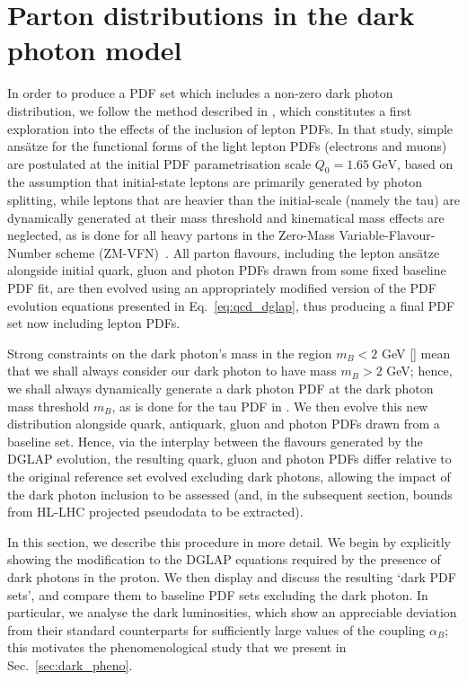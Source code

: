 \documentclass[withindex,glossary]{cam-thesis}
\begin{document}
\section{Parton distributions in the dark photon model}
\label{sec:dark_pdfs}
In order to produce a PDF set which includes a non-zero dark photon distribution,
we follow the method described in \cite{Bertone:2015lqa},
which constitutes a first exploration into the effects of the inclusion of lepton PDFs.
In that study, 
simple ans\"{a}tze for the functional forms of the light lepton PDFs (electrons and muons)
are postulated at the initial PDF parametrisation scale $Q_0 = 1.65\ \text{GeV}$, based on the assumption that
initial-state leptons are primarily generated by photon splitting, 
while leptons that are heavier than the initial-scale (namely the
tau) are dynamically generated at their mass threshold and
kinematical mass effects are neglected, as is done for all heavy
partons in the Zero-Mass Variable-Flavour-Number scheme (ZM-VFN)~\cite{Maltoni:2012pa,Bertone:2017djs}.  
%
All parton flavours, including the lepton ans\"{a}tze alongside initial quark,
gluon and photon PDFs drawn from some fixed baseline PDF fit, are then
evolved using an appropriately modified version of the PDF evolution equations presented
in Eq.~\eqref{eq:qcd_dglap}, thus producing
a final PDF set now including lepton PDFs. 

Strong constraints on the dark photon's mass in the region $m_B < 2$ GeV [] mean
that we shall always consider our dark photon to have mass $m_B > 2$ GeV; hence,
we shall always dynamically generate a dark photon PDF at the dark photon mass threshold $m_B$,
as is done for the tau PDF in \cite{Bertone:2015lqa}.
We then evolve this new distribution alongside quark, antiquark,
gluon and photon PDFs drawn from a baseline set.
Hence, via the interplay between the flavours generated by
the DGLAP evolution, the resulting quark, gluon and photon PDFs differ relative
to the original reference set evolved excluding dark photons, allowing the impact
of the dark photon inclusion to be assessed (and, in the subsequent section, bounds from HL-LHC
projected pseudodata to be extracted).

In this section, we describe this procedure in more detail.
We begin by explicitly showing the modification to the DGLAP equations
required by the presence of dark photons in the proton.
We then display and discuss the resulting `dark PDF sets',
and compare them to baseline PDF sets excluding the dark photon.
In particular, we analyse the dark luminosities, which show an appreciable deviation
from their standard counterparts for sufficiently large values of the coupling $\alpha_B$;
this motivates the phenomenological study that we present in Sec.~\ref{sec:dark_pheno}.
\end{document}
